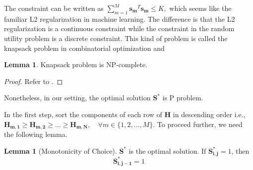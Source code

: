 \documentclass[12pt]{article}
\theoremstyle{definition}
\newtheorem{lemma}[theorem]{Lemma}
\newcommand{\matr}[1]{\mathbf{#1}} %
\begin{document}
\begin{sloppypar}
The constraint can be written as $\sum_{m=1}^{M}\matr{s_m}^T\matr{s_m} \leq K,$ which seems like the familiar L2 regularization in machine learning. The difference is that the L2 regularization is a continuous constraint while the constraint in the random utility problem is a discrete constraint. This kind of problem is called the knapsack problem in combinatorial optimization and
\begin{lemma}
    Knapsack problem is NP-complete.
\end{lemma}
\begin{proof}
    Refer to \textcite{garey1990}.
\end{proof}
Nonetheless, in our setting, the optimal solution $\matr{S}^{\ast}$ is P problem.

In the first step, sort the components of each row of $\matr{H}$ in descending order i.e., $\matr{H_{m,1}} \geq \matr{H_{m,2}} \geq ... \geq \matr{H_{m,N}}, \quad \forall m \in \{1,2,...,M\}$. To proceed further, we need the following lemma.
\begin{lemma}[Monotonicity of Choice]\label{lemma1}
    $\matr{S^{\ast}}$ is the optimal solution. If $\matr{S^{\ast}_{i,j}} = 1$, then
    \begin{equation*}
        \matr{S^{\ast}_{i,j-1}} = 1
    \end{equation*}
\end{lemma}


\end{sloppypar}
\end{document}
